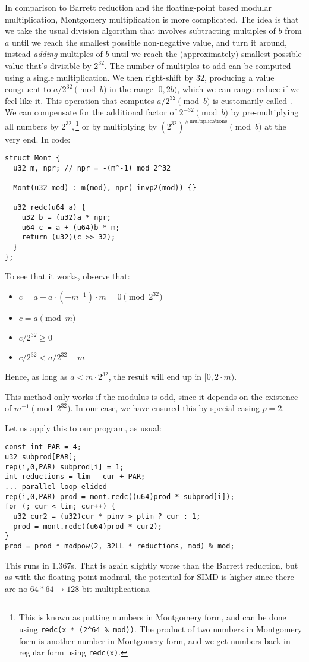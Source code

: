 In comparison to Barrett reduction and the floating-point based modular multiplication, Montgomery multiplication is more complicated.
The idea is that we take the usual division algorithm that involves subtracting multiples of $b$ from $a$ until we reach the smallest possible non-negative value, and turn it around, instead \emph{adding} multiples of $b$ until we reach the (approximately) smallest possible value that's divisible by $2^{32}$.
The number of multiples to add can be computed using a single multiplication.
We then right-shift by $32$, producing a value congruent to $a / 2^{32} \pmod b$ in the range $[0, 2b)$, which we can range-reduce if we feel like it.
This operation that computes $a / 2^{32} \pmod b$ is customarily called \verb@redc@.
We can compensate for the additional factor of $2^{-32} \pmod b$ by pre-multiplying all numbers by $2^{32},$\footnote{
This is known as putting numbers in Montgomery form, and can be done using \texttt{redc(x * (2\^{}64 \% mod))}.
The product of two numbers in Montgomery form is another number in Montgomery form, and we get numbers back in regular form using \texttt{redc(x)}.
} or by multiplying by $(2^{32})^{\text{\#multiplications}} \pmod b$ at the very end.
In code:

\begin{lstlisting}
struct Mont {
  u32 m, npr; // npr = -(m^-1) mod 2^32

  Mont(u32 mod) : m(mod), npr(-invp2(mod)) {}

  u32 redc(u64 a) {
    u32 b = (u32)a * npr;
    u64 c = a + (u64)b * m;
    return (u32)(c >> 32);
  }
};
\end{lstlisting}

To see that it works, observe that:
\begin{itemize}
  \item $c = a + a \cdot (-m^{-1}) \cdot m = 0 \pmod{2^{32}}$
  \item $c = a \pmod{m}$
  \item $c/2^{32} \ge 0$
  \item $c/2^{32} < a/2^{32} + m$
\end{itemize}
Hence, as long as $a < m\cdot 2^{32}$, the result will end up in $[0, 2\cdot m)$.

This method only works if the modulus is odd, since it depends on the existence of $m^{-1} \pmod{2^{32}}$. In our case, we have ensured this by special-casing $p = 2$.

Let us apply this to our program, as usual:
\begin{lstlisting}
const int PAR = 4;
u32 subprod[PAR];
rep(i,0,PAR) subprod[i] = 1;
int reductions = lim - cur + PAR;
... parallel loop elided
rep(i,0,PAR) prod = mont.redc((u64)prod * subprod[i]);
for (; cur < lim; cur++) {
  u32 cur2 = (u32)cur * pinv > plim ? cur : 1;
  prod = mont.redc((u64)prod * cur2);
}
prod = prod * modpow(2, 32LL * reductions, mod) % mod;
\end{lstlisting}
This runs in 1.367s.
That is again slightly worse than the Barrett reduction, but as with the floating-point modmul, the potential for SIMD is higher since there are no \mbox{$64*64\rightarrow128$}-bit multiplications.

